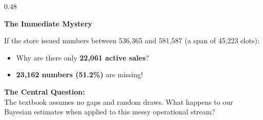 \documentclass[aspectratio=169,10pt]{beamer}
\begin{document}
\begin{frame}[c]
\begin{columns}[t,onlytextwidth]
\begin{column}{0.48\textwidth}
{\begin{minipage}{\dimexpr\linewidth-2\fboxsep-2\fboxrule\relax}
          {\small \textbf{\color{accentred} The Immediate Mystery}}\\[0.08cm]
          {\scriptsize
          If the store issued numbers between 536,365 and 581,587 (a span of 45,223 slots):
          \begin{itemize}
            \setlength{\itemsep}{0.06cm}
            \item Why are there only \textbf{22,061 active sales}?
            \item \textbf{23,162 numbers (51.2\%)} are missing!
          \end{itemize}
          \vspace{0.06cm}
          \textbf{The Central Question:}\\[0.04cm]
          The textbook assumes no gaps and random draws. What happens to our Bayesian estimates when applied to this messy operational stream?}
          \vspace{0.08cm}
        \end{minipage}
      }
    \end{column}
  \end{columns}
  
  \vspace{0.20cm}
  \begin{center}
    \setlength{\fboxrule}{1pt}
  \end{center}
\end{frame}
\end{document}
